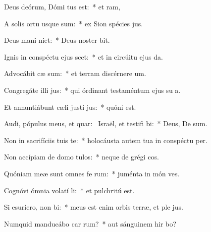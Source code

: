 \item Deus deórum, Dómi tus est:~* et  ram,
\item A solis ortu usque  sum:~* ex Sion spécies  jus.
\item Deus mani niet:~* Deus noster   bit.
\item Ignis in conspéctu ejus scet:~* et in circúitu ejus  da.
\item Advocábit cæ sum:~* et terram discérnere  um.
\item Congregáte illi  jus:~* qui órdinant testaméntum ejus su a.
\item Et annuntiábunt cæli justí jus:~* quóni   est.
\item Audi, pópulus meus, et quar:~\pscross{} Israël, et testifi bi:~* Deus, De   sum.
\item Non in sacrifíciis tuis  te:~* holocáusta autem tua in conspéctu   per.
\item Non accípiam de domo  tulos:~* neque de grégi  cos.
\item Quóniam meæ sunt omnes fe rum:~* juménta in món  ves.
\item Cognóvi ómnia volatí li:~* et pulchritú   est.
\item Si esuríero, non  bi:~* meus est enim orbis terræ, et ple jus.
\item Numquid manducábo car rum?~* aut sánguinem hir bo?
